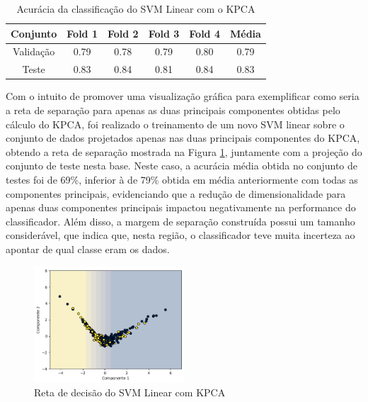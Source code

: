 \documentclass[]{abntex2}
\begin{document}
\begin{table}[H]
    \centering
    \begin{tabular}{|c|c|c|c|c|c|}
    \hline
    \rowcolor[HTML]{C0C0C0} 
    Conjunto                          & Fold 1 & Fold 2 & Fold 3 & Fold 4 & Média  \\ \hline
    \cellcolor[HTML]{C0C0C0}Validação & 0.79   & 0.78   & 0.79   & 0.80   & 0.79  \\ \hline
    \cellcolor[HTML]{C0C0C0}Teste     & 0.83   & 0.84   & 0.81   & 0.84   & 0.83 \\ \hline
    \end{tabular}
    \caption{Acurácia da classificação do SVM Linear com o KPCA}
    \label{tab:kpca_svm}
\end{table}

Com o intuito de promover uma visualização gráfica para exemplificar como seria a reta de separação para apenas as duas principais componentes obtidas pelo cálculo do KPCA, foi realizado o treinamento de um novo SVM linear sobre o conjunto de dados projetados apenas nas duas principais componentes do KPCA, obtendo a reta de separação mostrada na Figura \ref{fig:kpca_reta}, juntamente com a projeção do conjunto de teste nesta base. Neste caso, a acurácia média obtida no conjunto de testes foi de 69\%, inferior à de 79\% obtida em média anteriormente com todas as componentes principais, evidenciando que a redução de dimensionalidade para apenas duas componentes principais impactou negativamente na performance do classificador. Além disso, a margem de separação construída possui um tamanho considerável, que indica que, nesta região, o classificador teve muita incerteza ao apontar de qual classe eram os dados.

\begin{figure}[H]
    \centering 
    \includegraphics[width=0.5\textwidth]{imgs/ex1/kpca_reta.png}
    \caption{Reta de decisão do SVM Linear com KPCA}
    \label{fig:kpca_reta} %
\end{figure}
\end{document}
